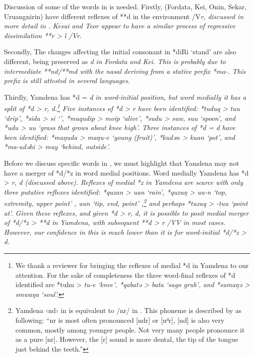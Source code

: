 Discussion of some of the words in  is needed.
Firstly,  (Fordata, Kei,
Onin, Sekar, Uruangnirin) have different reflexes of **d in the
environment /{\gap}V\it{r}, discussed in more detail in .
Kesui and Teor appear to have a similar process of regressive
dissimilation **r > \it{l} /{\gap}\it{Vr}.

Secondly, The changes affecting the initial consonant in *diRi
‘stand’ are also different,
being preserved as \it{d} in Fordata and Kei.
This is probably due to intermediate **nd/**md with the nasal
deriving from a stative prefix *ma-.
This prefix is still attested in several languages.

Thirdly, Yamdena has *d = \it{d} in word-initial position,
but word medially it has a split of *d > \it{r,
d}.\footnote{
		We thank a reviewer for bringing the reflexes of
		medial *d in Yamdena to our attention.
		For the sake of completeness the three word-final reflexes of
		*d identified are *tuhu > \it{tu-e} ‘knee’,
		*qabatə > \it{bata} ‘sago grub’,
		and *sumaŋə > \it{smwaŋa} ‘soul’.}
Five instances
of *d > \it{r} have been identified: *tuduq > \it{tuu}
‘drip’,  *sida > \it{si} ‘’,
*maqudip > \it{moip} ‘alive’,
*sudu > \it{suw, suu} ‘spoon’,
and  *udu > \it{uu} ‘grass that grows about knee high’.
Three instances of *d = \it{d} have been identified: *maŋuda
> \it{maŋu-e} ‘young (fruit)’,
*kudən > \it{kuan} ‘pot’,
and *ma-udəhi > \it{muy} ‘behind, outside’.

Before we discuss specific words in ,
we must highlight that Yamdena may not have a merger of *d/*z
in word medial positions.
Word medially Yamdena has *d > \it{r, d} (discussed above).
Reflexes of medial *z in Yamdena are scarce with only three putative
reflexes identified: *quzan > \it{uan} ‘rain’,
*quzuŋ > \it{uu-n} ‘top,
extremity, upper point’ \citep[115]{Drabbe1932b}, \it{uun}
‘tip, end, point’ \citep{MettlerMettler1996},\footnote{
		Yamdena ‹nd›
		in \citet{Drabbe1932b} is equivalent to /nr/ in
		\citet{MettlerMettler1996,MettlerMettler1997}.
		This phoneme is described by \citet{MettlerMettler1997} as following:
		“nr is most often pronounced [ndr] or [nᵈr],
		[nd] is also very common,
		mostly among younger people.
		Not very many people pronounce it as a pure [nr].
		However, the [r] sound is more dental,
		the tip of the tongue just behind the teeth.”} 
and perhaps *tuzuq > \it{-tuu} ‘point at’.
Given these reflexes, and given *d > \it{r,
d}, it is possible to posit medial merger of *d/*z > **d in Yamdena,
with subsequent **d > \it{r} /V{\gap}V in most cases.
However, our confidence in this is much lower than it is for
word-initial *d/*z > \it{d}.

